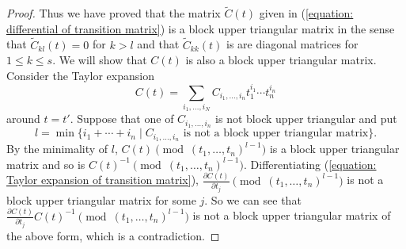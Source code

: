 \documentclass[pdftex]{sigma}
\numberwithin{equation}{section}
\begin{document}
\begin{proof}
Thus we have proved that
the matrix $\tilde{C}(t)$ given in (\ref{equation: differential of transition matrix})
is a block upper triangular matrix in the sense that
$\tilde{C}_{kl}(t)=0$ for $k>l$
and that $\tilde{C}_{kk}(t)$ is are diagonal matrices for $1\leq k\leq s$.
We will show that $C(t)$ is also a block upper triangular matrix.
Consider the Taylor expansion
\begin{equation} \label{equation: Taylor expansion of transition matrix}
 C(t)=
 \sum_{i_1,\dots,i_N} C_{i_1,\dots,i_n}t_1^{i_1}\cdots t_n^{i_n}
\end{equation}
around $t=t'$.
Suppose that one of $C_{i_1,\dots,i_n}$ is not block upper triangular
and put
\[
 l=\min \big\{i_1+\cdots+i_n \mid
 \text{$C_{i_1,\dots,i_n}$ is not a block upper triangular matrix}\big\}.
\]
By the minimality of $l$,
$C(t) \pmod{(t_1,\dots,t_n)^{l-1}}$ is a block upper triangular matrix
and so is $C(t)^{-1} \pmod{(t_1,\dots,t_n)^{l-1}}$.
Differentiating (\ref{equation: Taylor expansion of transition matrix}),
$\frac{\partial C(t)} {\partial t_j} \pmod{(t_1,\dots,t_n)^{l-1}}$
is not a block upper triangular matrix for some $j$.
So we can see that
$\frac{\partial C(t)} {\partial t_j}
C(t)^{-1} \pmod{(t_1,\dots,t_n)^{l-1}}$
is not a block upper triangular matrix of the above form, which is a contradiction.


\end{proof}
\end{document}

